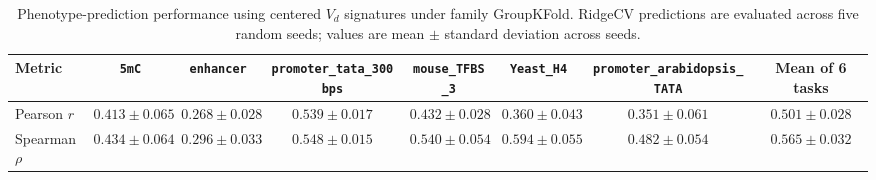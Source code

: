 \begin{table}[t]
  \centering
  \caption{Phenotype-prediction performance using centered $V_d$ signatures under family GroupKFold. RidgeCV predictions are evaluated across five random seeds; values are mean $\pm$ standard deviation across seeds.}
  \label{tab:fig4b_vd_family_groupkfold}
  \small
  \setlength{\tabcolsep}{4.5pt}
  \begin{tabular}{l c c c c c c c}
    \toprule
    Metric & \texttt{5mC} & \texttt{enhancer} & \texttt{promoter\_tata\_300bps} & \texttt{mouse\_TFBS\_3} & \texttt{Yeast\_H4} & \texttt{promoter\_arabidopsis\_TATA} & Mean of 6 tasks \\
    \midrule
    Pearson $r$ & $0.413 \pm 0.065$ & $0.268 \pm 0.028$ & $0.539 \pm 0.017$ & $0.432 \pm 0.028$ & $0.360 \pm 0.043$ & $0.351 \pm 0.061$ & $0.501 \pm 0.028$ \\
    Spearman $\rho$ & $0.434 \pm 0.064$ & $0.296 \pm 0.033$ & $0.548 \pm 0.015$ & $0.540 \pm 0.054$ & $0.594 \pm 0.055$ & $0.482 \pm 0.054$ & $0.565 \pm 0.032$ \\
    \bottomrule
  \end{tabular}
\end{table}
